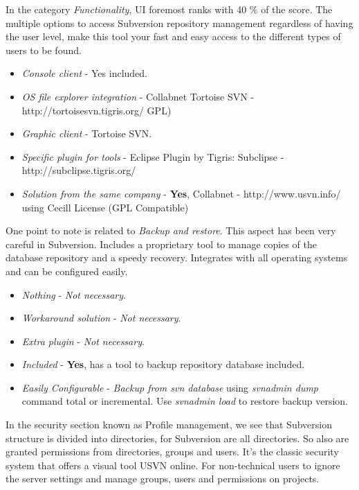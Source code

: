 \documentclass[11pt]{scrartcl}
\begin{document}
\par In the category \emph{Functionality}, UI foremost ranks with 40 \% of the score. The multiple options to access Subversion repository management regardless of having the user level, make this tool your fast and easy access to the different types of users to be found.

\begin{itemize}
    \item \emph{Console client} - Yes included.
    \item \emph{OS file explorer integration} - Collabnet Tortoise SVN - http://tortoisesvn.tigris.org/ GPL)
    \item \emph{Graphic client} - Tortoise SVN.
    \item \emph{Specific plugin for tools} - Eclipse Plugin by Tigris: Subclipse - http://subclipse.tigris.org/
    \item \emph{Solution from the same company} - \textbf{Yes}, Collabnet - http://www.usvn.info/ using Cecill License (GPL Compatible)
\end{itemize}

\par One point to note is related to \emph{Backup and restore}. This aspect has been very careful in Subversion. Includes a proprietary tool to manage copies of the database repository and a speedy recovery. Integrates with all operating systems and can be configured easily.

\begin{itemize}
    \item \emph{Nothing} - \emph{Not necessary}.
    \item \emph{Workaround solution} - \emph{Not necessary}.
    \item \emph{Extra plugin} - \emph{Not necessary}.
    \item \emph{Included} - \textbf{Yes}, has a tool to backup repository database included.
    \item \emph{Easily Configurable} - \emph{Backup from svn database} using \emph{svnadmin dump} command total or incremental. Use \emph{svnadmin load} to restore backup version.
\end{itemize}

\par In the security section known as Profile management, we see that Subversion structure is divided into directories, for Subversion are all directories. So also are granted permissions from directories, groups and users. It's the classic security system that offers a visual tool USVN online. For non-technical users to ignore the server settings and manage groups, users and permissions on projects.
\end{document}
